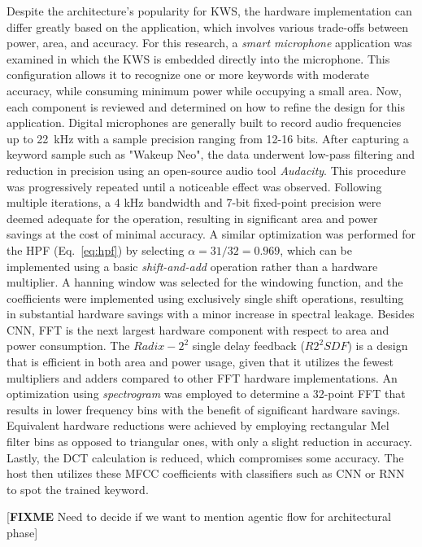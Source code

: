 Despite the architecture's popularity for KWS, the hardware implementation can differ greatly based on the application, which involves various trade-offs between power, area, and accuracy.
For this research, a \textit{smart microphone } application was examined in which the KWS is embedded directly into the microphone. This configuration allows it to recognize one or more keywords with moderate accuracy, while consuming minimum power while occupying a small area.
Now, each component is reviewed and determined on how to refine the design for this application. Digital microphones are generally built to record audio frequencies up to 22~kHz with a sample precision ranging from 12-16 bits. After capturing a keyword sample such as "Wakeup Neo", the data underwent low-pass filtering and reduction in precision using an open-source audio tool \textit{Audacity}. This procedure was progressively repeated until a noticeable effect was observed. Following multiple iterations, a 4 kHz bandwidth and 7-bit fixed-point precision were deemed adequate for the operation, resulting in significant area and power savings at the cost of minimal accuracy.
A similar optimization was performed for the HPF (Eq.~\ref{eq:hpf}) by selecting $\alpha=31/32=0.969$, which can be implemented using a basic \textit{shift-and-add} operation rather than a hardware multiplier. 
A hanning window was selected for the windowing function, and the coefficients were implemented using exclusively single shift operations, resulting in substantial hardware savings with a minor increase in spectral leakage. 
Besides CNN, FFT is the next largest hardware component with respect to area and power consumption. The $Radix-2^2$ single delay feedback ($R2^2SDF$) is a design that is efficient in both area and power usage, given that it utilizes the fewest multipliers and adders compared to other FFT hardware implementations. An optimization using \textit{spectrogram} was employed to determine a 32-point FFT that results in lower frequency bins with the benefit of significant hardware savings.
Equivalent hardware reductions were achieved by employing rectangular Mel filter bins as opposed to triangular ones, with only a slight reduction in accuracy. 
Lastly, the DCT calculation is reduced, which compromises some accuracy. The host then utilizes these MFCC coefficients with classifiers such as CNN or RNN to spot the trained keyword.

[\textbf{FIXME} Need to decide if we want to mention agentic flow for architectural phase]

